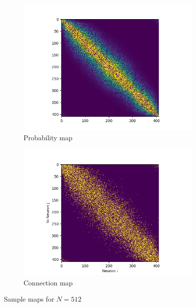 \documentclass[a4paper,12pt]{article}
\begin{document}
\begin{figure}
    \begin{subfigure}{0.55\textwidth}
        \centering
        \includegraphics[width=\textwidth]{prob_map.png}
        \caption{Probability map}
        \label{prob_map}
    \end{subfigure}%
    \hfill
    \begin{subfigure}{0.55\textwidth}
        \centering
        \includegraphics[width=\textwidth]{connections.png}
        \caption{Connection map}
        \label{connectionmap}
    \end{subfigure}
    \caption{Sample maps for $N = 512$}
\end{figure}
\end{document}
